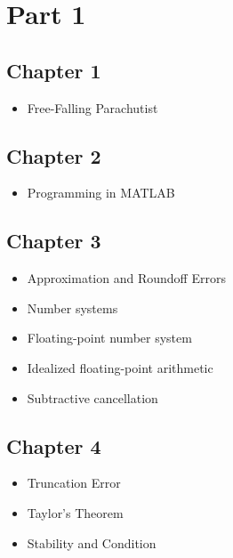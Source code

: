 \documentclass [titlepage,12pt,letter] {article}
\begin{document}
 


\section{Part 1}

\subsection{Chapter 1}

\begin{itemize}

\item{Free-Falling Parachutist}

\end{itemize}

\subsection{Chapter 2}

\begin{itemize}

\item{Programming in MATLAB} 

\end{itemize}

\subsection{Chapter 3}

\begin{itemize}

\item{Approximation and Roundoff Errors} 

\item{Number systems} 

\item{Floating-point number system} 

\item{Idealized floating-point arithmetic} 

\item{Subtractive cancellation} 

\end{itemize}

\subsection{Chapter 4}

\begin{itemize}

\item{Truncation Error}

\item{Taylor's Theorem}

\item{Stability and Condition} 

\end{itemize}
\end{document}
